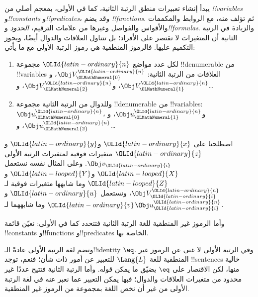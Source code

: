 \documentclass[../../../include/open-logic-section]{subfiles}
\begin{document}


يبدأ إنشاء تعبيرات منطق الرتبة الثانية، كما في الأولى، بمعجم
أصلي من \emph{!!{variable}s} و\emph{!!{constant}s}
و\emph{!!{predicate}s}، وقد يضم \emph{!!{function}s}.
ثم تؤلف منه، مع الروابط والمكممات والأقواس والفواصل وغيرها من
علامات الترقيم، \emph{الحدود} و\emph{!!{formula}s}.
والزيادة في الرتبة الثانية أن المتغيرات لا تقتصر على الأفراد؛
بل تتناول العلاقات والدوال أيضًا، ويجوز التكميم عليها.
فالرموز المنطقية هي رموز الرتبة الأولى مع ما يأتي:

\begin{enumerate}
\item لكل عدد مواضع $\OLId{latin-ordinary}{n}$ مجموعة !!{denumerable} من
  !!{variable}s العلاقات من الرتبة الثانية:
  $\Obj V_\OLMathNumeral{0}^\OLId{latin-ordinary}{n}$، و$\Obj V_\OLMathNumeral{1}^\OLId{latin-ordinary}{n}$، و$\Obj V_\OLMathNumeral{2}^\OLId{latin-ordinary}{n}$، و\dots
\item وللدوال من الرتبة الثانية مجموعة !!{denumerable} من
  !!{variable}s: $\Obj u_\OLMathNumeral{0}^\OLId{latin-ordinary}{n}$، و$\Obj u_\OLMathNumeral{1}^\OLId{latin-ordinary}{n}$، و$\Obj u_\OLMathNumeral{2}^\OLId{latin-ordinary}{n}$، و\dots
\end{enumerate}

اصطلحنا على $\OLId{latin-ordinary}{x}$ و$\OLId{latin-ordinary}{y}$ و$\OLId{latin-ordinary}{z}$ متغيرات فوقية لمتغيرات الرتبة
الأولى $\Obj v_\OLId{latin-ordinary}{i}$. وعلى المثال نفسه نستعمل $\OLId{latin-looped}{X}$ و$\OLId{latin-looped}{Y}$ و$\OLId{latin-looped}{Z}$
وما شابهها متغيرات فوقية لـ$\Obj V_\OLId{latin-ordinary}{i}^\OLId{latin-ordinary}{n}$، ونستعمل $\OLId{latin-ordinary}{u}$ و$\OLId{latin-ordinary}{v}$
وما شابههما لـ$\Obj u_\OLId{latin-ordinary}{i}^\OLId{latin-ordinary}{n}$.

\begin{explain}
وأما الرموز غير المنطقية للغة الرتبة الثانية فتتحدد كما في
الأولى: نعيّن قائمة !!{constant}s و!!{function}s
و!!{predicate}s الخاصة بها.

وتضم لغة الرتبة الأولى عادةً الـ!!{identity} $\eq$.
وفي الرتبة الأولى لا غنى عن الرموز غير المنطقية للغة $\Lang{L}$
للتعبير عن أمور ذات شأن؛ فنعم، توجد !!{sentence}s خالية
منها، لكن الاقتصار على $\eq$ يضيّق ما يمكن قوله.
وأما الرتبة الثانية فتتيح عددًا غير محدود من متغيرات العلاقات
والدوال؛ فبها يمكن التعبير عما نعبر عنه في لغة الرتبة الأولى
من غير أن نخص اللغة بمجموعة من الرموز غير المنطقية.
\end{explain}
\end{document}
